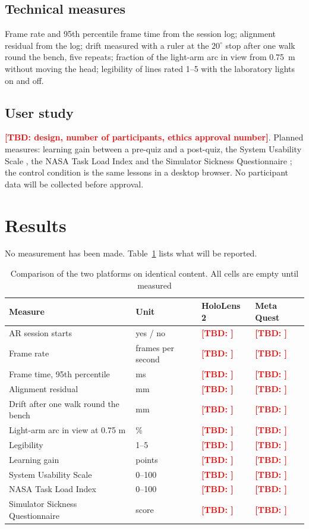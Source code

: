\documentclass[11pt]{article}
\newcommand{\tbd}[1]{\textcolor{red}{\textbf{[TBD: #1]}}}
\begin{document}
\subsection{Technical measures}
Frame rate and 95th percentile frame time from the session log; alignment residual from the log; drift measured with a
ruler at the $20^\circ$ stop after one walk round the bench, five repeats; fraction of the light-arm arc in view from
0.75~m without moving the head; legibility of lines rated 1--5 with the laboratory lights on and off.

\subsection{User study}
\tbd{design, number of participants, ethics approval number}. Planned measures: learning gain between a pre-quiz and a
post-quiz, the System Usability Scale \parencite{X9}, the NASA Task Load Index \parencite{X10} and the Simulator
Sickness Questionnaire \parencite{X11}; the control condition is the same lessons in a desktop browser. No participant
data will be collected before approval.

\section{Results}
No measurement has been made. Table~\ref{tab:results} lists what will be reported.

\begin{table}[ht]
\caption{Comparison of the two platforms on identical content. All cells are empty until measured}\label{tab:results}
\begin{tabularx}{\linewidth}{Xlll}
\toprule
Measure & Unit & HoloLens 2 & Meta Quest\\
\midrule
AR session starts & yes / no & \tbd{} & \tbd{}\\
Frame rate & frames per second & \tbd{} & \tbd{}\\
Frame time, 95th percentile & ms & \tbd{} & \tbd{}\\
Alignment residual & mm & \tbd{} & \tbd{}\\
Drift after one walk round the bench & mm & \tbd{} & \tbd{}\\
Light-arm arc in view at 0.75 m & \% & \tbd{} & \tbd{}\\
Legibility & 1--5 & \tbd{} & \tbd{}\\
Learning gain & points & \tbd{} & \tbd{}\\
System Usability Scale & 0--100 & \tbd{} & \tbd{}\\
NASA Task Load Index & 0--100 & \tbd{} & \tbd{}\\
Simulator Sickness Questionnaire & score & \tbd{} & \tbd{}\\
\bottomrule
\end{tabularx}
\end{table}
\end{document}
